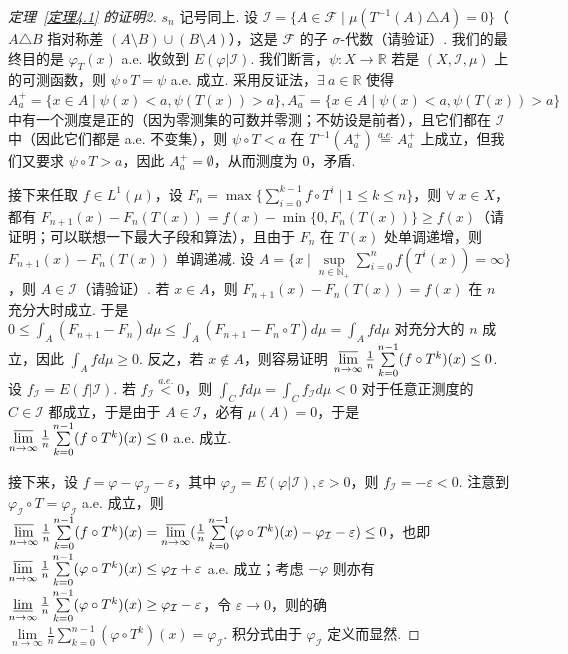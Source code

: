 \documentclass[11pt, a4paper, oneside]{ctexart}
\newcommand{\N}{\mathbb{N}}
\newcommand{\R}{\mathbb{R}}
\newcommand{\cF}{\mathcal{F}}
\newcommand{\cI}{\mathcal{I}}
\begin{document}
    \begin{proof}[定理~\ref{定理4.1} 的证明2]
        $s_n$ 记号同上. 设 $\cI=\{A\in \cF\mid \mu(T^{-1}(A)\triangle A)=0\}$（$A\triangle B$ 指对称差 $(A\setminus B)\cup (B\setminus A)$），这是 $\cF$ 的子 $\sigma$-代数（请验证）. 我们的最终目的是 $\varphi_T(x)$ a.e. 收敛到 $E(\varphi|\cI)$. 我们断言，$\psi:X\to \R$ 若是 $(X,\cI,\mu)$ 上的可测函数，则 $\psi\circ T=\psi$ a.e. 成立. 采用反证法，$\exists\ a\in \R$ 使得 $A_a^+=\{x\in A\mid \psi(x)<a,\psi(T(x))>a\},A_a^-=\{x\in A\mid \psi(x)<a,\psi(T(x))>a\}$ 中有一个测度是正的（因为零测集的可数并零测；不妨设是前者），且它们都在 $\cI$ 中（因此它们都是 a.e. 不变集），则 $\psi\circ T<a$ 在 $T^{-1}(A_a^+)\stackrel{a.e.}{=}A_a^+$ 上成立，但我们又要求 $\psi\circ T>a$，因此 $A_a^+=\emptyset$，从而测度为 $0$，矛盾.
        
        接下来任取 $f\in L^1(\mu)$，设 $F_n=\max\{\sum\limits_{i=0}^{k-1}f\circ T^i\mid 1\leq k\leq n\}$，则 $\forall\ x\in X$，都有 $F_{n+1}(x)-F_n(T(x))=f(x)-\min\{0,F_n(T(x))\}\geq f(x)$（请证明；可以联想一下最大子段和算法），且由于 $F_n$ 在 $T(x)$ 处单调递增，则 $F_{n+1}(x)-F_n(T(x))$ 单调递减. 设 $A=\{x\mid \sup\limits_{n\in\N_+}\sum\limits_{i=0}^{n}f(T^i(x))=\infty\}$，则 $A\in \cI$（请验证）. 若 $x\in A$，则 $F_{n+1}(x)-F_n(T(x))=f(x)$ 在 $n$ 充分大时成立. 于是 $0\leq \int_{A}(F_{n+1}-F_n)d\mu\leq \int_{A}(F_{n+1}-F_n\circ T)d\mu=\int_{A}fd\mu$ 对充分大的 $n$ 成立，因此 $\int_{A}fd\mu\geq 0$. 反之，若 $x\notin A$，则容易证明 $\varlimsup\limits_{n\to\infty}\frac{1}{n}\sum\limits_{k=0}^{n-1}(f\circ T^k)(x)\leq 0$. 设 $f_{\cI}=E(f|\cI)$. 若 $f_{\cI}\stackrel{a.e.}{<}0$，则 $\int_{C}fd\mu=\int_{C}f_{\cI}d\mu<0$ 对于任意正测度的 $C\in \cI$ 都成立，于是由于 $A\in \cI$，必有 $\mu(A)=0$，于是 $\varlimsup\limits_{n\to\infty}\frac{1}{n}\sum\limits_{k=0}^{n-1}(f\circ T^k)(x)\leq 0$ a.e. 成立.

        接下来，设 $f=\varphi-\varphi_{\cI}-\varepsilon$，其中 $\varphi_{\cI}=E(\varphi|\cI),\varepsilon>0$，则 $f_{\cI}=-\varepsilon<0$. 注意到 $\varphi_{\cI}\circ T=\varphi_{\cI}$ a.e. 成立，则 $\varlimsup\limits_{n\to\infty}\frac{1}{n}\sum\limits_{k=0}^{n-1}(f\circ T^k)(x)=\varlimsup\limits_{n\to\infty}(\frac{1}{n}\sum\limits_{k=0}^{n-1}(\varphi\circ T^k)(x)-\varphi_{\cI}-\varepsilon)\leq 0$，也即 $\varlimsup\limits_{n\to\infty}\frac{1}{n}\sum\limits_{k=0}^{n-1}(\varphi\circ T^k)(x)\leq \varphi_{\cI}+\varepsilon$ a.e. 成立；考虑 $-\varphi$ 则亦有 $\varliminf\limits_{n\to\infty}\frac{1}{n}\sum\limits_{k=0}^{n-1}(\varphi\circ T^k)(x)\geq \varphi_{\cI}-\varepsilon$，令 $\varepsilon\to 0$，则的确 $\lim\limits_{n\to\infty}\frac{1}{n}\sum\limits_{k=0}^{n-1}(\varphi\circ T^k)(x)=\varphi_{\cI}$. 积分式由于 $\varphi_{\cI}$ 定义而显然.
    \end{proof}
\end{document}
